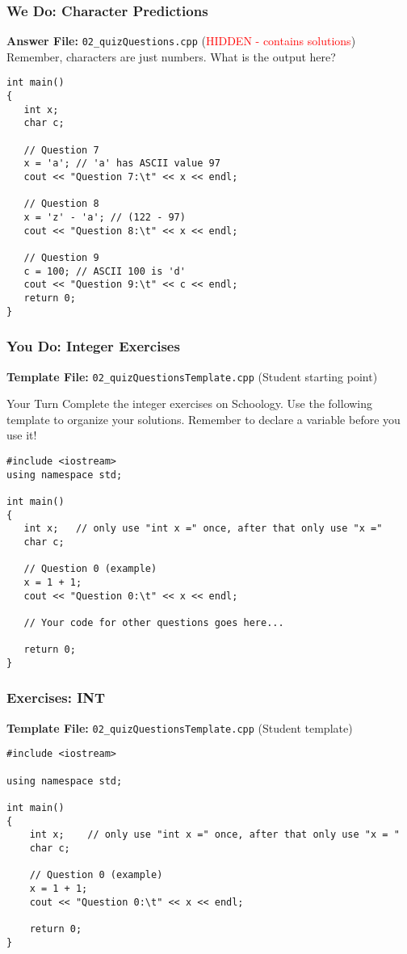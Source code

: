 \documentclass{beamer}
\begin{document}
\begin{frame}[fragile]
\frametitle{We Do: Character Predictions}
\textbf{Answer File:} \texttt{02\_quizQuestions.cpp} (\textcolor{red}{HIDDEN - contains solutions})
\\Remember, characters are just numbers. What is the output here?\pause
\begin{verbatim}
int main()
{
   int x;
   char c;

   // Question 7
   x = 'a'; // 'a' has ASCII value 97
   cout << "Question 7:\t" << x << endl;
   
   // Question 8
   x = 'z' - 'a'; // (122 - 97)
   cout << "Question 8:\t" << x << endl;

   // Question 9
   c = 100; // ASCII 100 is 'd'
   cout << "Question 9:\t" << c << endl;
   return 0;
}
\end{verbatim}
\end{frame}

\begin{frame}[fragile]
\frametitle{You Do: Integer Exercises}
\textbf{Template File:} \texttt{02\_quizQuestionsTemplate.cpp} (Student starting point)
\begin{block}{Your Turn}
Complete the integer exercises on Schoology. Use the following template to organize your solutions. Remember to declare a variable before you use it!
\end{block}
\begin{verbatim}
#include <iostream>
using namespace std;

int main()
{
   int x;   // only use "int x =" once, after that only use "x ="
   char c;

   // Question 0 (example)
   x = 1 + 1;
   cout << "Question 0:\t" << x << endl;

   // Your code for other questions goes here...

   return 0;
}
\end{verbatim}
\end{frame}

\begin{frame}[fragile]
\frametitle{Exercises: INT}
\textbf{Template File:} \texttt{02\_quizQuestionsTemplate.cpp} (Student template)
\begin{verbatim}
#include <iostream>

using namespace std;

int main()
{
    int x;    // only use "int x =" once, after that only use "x = "
    char c;

    // Question 0 (example)
    x = 1 + 1;
    cout << "Question 0:\t" << x << endl;

    return 0;
}
\end{verbatim}
\end{frame}
\end{document}
